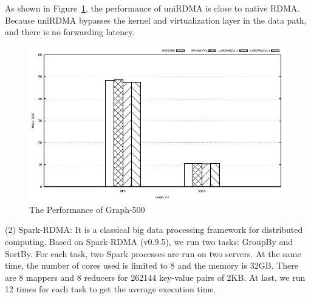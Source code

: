 As shown in Figure~\ref{fig:graph-500},  the performance of uniRDMA is close to native RDMA. Because uniRDMA bypasses the kernel and virtualization layer in the data path, and there is no forwarding latency.

\begin{figure}[!ht]
	\centering
	\includegraphics[width=1.0\linewidth]{images/graph-500.pdf}
	\caption{The Performance of Graph-500}
	\label{fig:graph-500}
\end{figure}

(2) Spark-RDMA: It is a classical big data processing framework for distributed computing. Based on Spark-RDMA (v0.9.5), we run two tasks: GroupBy and SortBy. For each task, two Spark processes are run on two servers. At the same time, the number of cores used is limited to 8 and the memory is 32GB. There are 8 mappers and 8 reducers for 262144 key-value pairs of 2KB. At last, we run 12 times for each task to get the average execution time.

